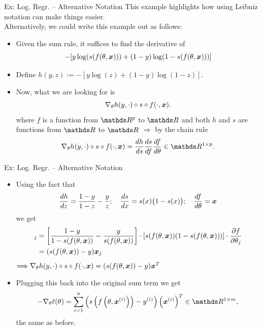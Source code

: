 \documentclass[11pt,compress,t,notes=noshow, xcolor=table]{beamer}
\begin{document}
\begin{framev}{Ex: Log. Regr. -- Alternative Notation}
This example highlights how using Leibniz notation can make things easier.\\
Alternatively, we could write this example out as follows:
\begin{itemize}
\item Given the sum rule, it suffices to find the derivative of
$$
-[y \log (s(f(\theta,\bm{x})))+(1-y) \log (1-s(f(\theta,\bm{x})))]
$$
\item Define $h(y,z):=-[y \log (z)+(1-y) \log (1-z)]$.
\item Now, what we are looking for is
$$
\nabla_\theta h(y,\cdot)\circ s \circ f(\cdot,\bm{x}).
$$
where $f$ is a function from $\R^p$ to $\R$ and both $h$ and $s$ are functions from $\R$ to $\R$
$\Longrightarrow$ by the chain rule
$$
\nabla_\theta h(y,\cdot)\circ s \circ f(\cdot,\xv)=\frac{d h}{d s} \frac{d s}{d f} \frac{d f}{d \theta}\in\R^{1\times p}.
$$
\end{itemize}
\end{framev}


\begin{framev}{Ex: Log. Regr. -- Alternative Notation}
\begin{itemize}
\item Using the fact that $$\frac{d h}{d z}=\frac{1-y}{1-z}-\frac{y}{z};\quad\frac{d s}{d x}=s(x)\big(1-s(x)\big);\quad\frac{d f}{d \theta}=\bm{x}$$ we get \begin{align*}
[\nabla_\theta h(y,\cdot)\circ s \circ f(\cdot,\xv)]_j&=\left[\frac{1-y}{1-s(f(\theta,\xv))}-\frac{y}{s(f(\theta,\xv))}\right] \cdot \left[s(f(\theta,\xv))(1-s(f(\theta,\xv)))\right]\cdot \frac{\partial f}{\partial\theta_j}\\
&=(s(f(\theta,\xv))-y)\xv_j
\end{align*}
$\Longrightarrow \nabla_\theta h(y,\cdot)\circ s \circ f(\cdot,\bm{x})=(s(f(\theta,\bm{x}))-y)\bm{x}^T$
\item Plugging this back into the original sum term we get $$
-\nabla_\theta \ell (\theta)=\sumin\left(s\left(f\left(\theta,\xv^{(i)}\right)\right)-y^{(i)}\right)\left(\xv^{(i)}\right)^T\in\R^{1\times m},
$$ the same as before.
\end{itemize}
\end{framev}

\endlecture
\end{document}
